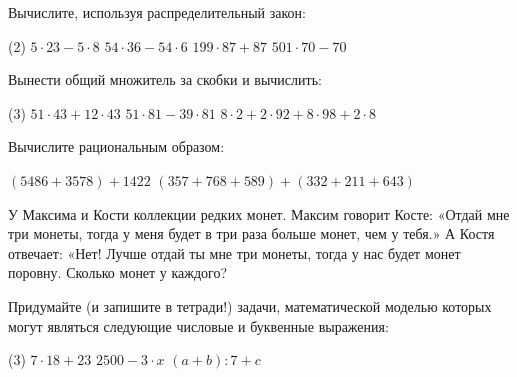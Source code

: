 \begin{homework}[number=2]
	\begin{listofex}
	\item Вычислите, используя распределительный закон:
	\begin{tasks}(2)
		\task\( 5\cdot23-5\cdot8 \)
		\task \( 54\cdot36-54\cdot6 \)
		\task \( 199\cdot87+87 \)
		\task \( 501\cdot70-70 \)
	\end{tasks}
	\item Вынести общий множитель за скобки и вычислить:
	\begin{tasks}(3)
		\task \( 51\cdot43+12\cdot43 \)
		\task \( 51\cdot81-39\cdot81 \)
		\task \( 8\cdot2+2\cdot92+8\cdot98+2\cdot8 \)
	\end{tasks}
	\item Вычислите рациональным образом:
	\begin{tasks}
		\task \( (5486+3578)+1422 \)
		\task \( (357+768+589)+(332+211+643) \)
	\end{tasks}
	\item У Максима и Кости коллекции редких монет. Максим говорит Косте: «Отдай мне три монеты, тогда у меня будет в три раза больше
	монет, чем у тебя.» А Костя отвечает: «Нет! Лучше отдай ты мне три монеты, тогда у нас будет монет поровну. Сколько монет у каждого?
	\item Придумайте (и запишите в тетради!) задачи, математической моделью которых могут
	являться следующие числовые и буквенные выражения:
	\begin{tasks}(3)
		\task \( 7\cdot18+23 \)
		\task \( 2500 - 3\cdot x \)
		\task \( (a+b):7+c \)
	\end{tasks}
	\end{listofex}
\end{homework}

